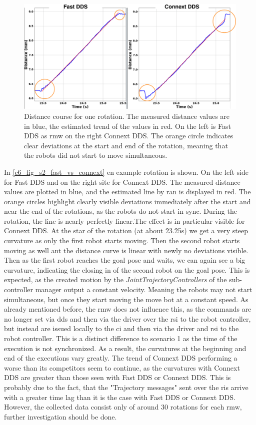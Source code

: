 \begin{figure}[H]
	\centering
	\includegraphics[width=1\textwidth]{Figures/c6/s2/s2_fast_vs_connext.png}
	\caption{Distance course for one rotation. The measured distance values are in blue, the estimated trend of the values in red. On the left is Fast DDS as \gls{rmw} on the right Connext DDS. The orange circle indicates clear deviations at the start and end of the rotation, meaning that the robots did not start to move simultaneous.}
	\label{c6_fig_s2_fast_vs_connext}
\end{figure}
In \autoref{c6_fig_s2_fast_vs_connext} en example rotation is shown. On the left side for Fast DDS and on the right site for Connext DDS. The measured distance values are plotted in blue, and the estimated line by \gls{ran} is displayed in red. The orange circles highlight clearly visible deviations immediately after the start and near the end of the rotations, as the robots do not start in sync. During the rotation, the line is nearly perfectly linear.The effect is in particular visible for Connext DDS. At the star of the rotation (at about 23.25s) we get a very steep curvature as only the first robot starts moving. Then the second robot starts moving as well ant the distance curve is linear with newly no deviations visible. Then as the first robot reaches the goal pose and waits, we can again see a big curvature, indicating the closing in of the second robot on the goal pose.\newline
This is expected, as the created motion by the \textit{JointTrajectoryControllers} of the sub-controller manager output a constant velocity. Meaning the robots may not start simultaneous, but once they start moving the move bot at a constant speed. As already mentioned before, the \gls{rmw} does not influence this, as the commands are no longer set via \gls{dds} and then via the driver over the \gls{rsi} to the robot controller, but instead are issued locally to the \gls{ci} and then via the driver and \gls{rsi} to the robot controller. This is a distinct difference to scenario 1 as the time of the execution is not synchronized. As a result, the curvatures at the beginning and end of the executions vary greatly. The trend of Connext DDS performing a worse than its competitors seem to continue, as the curvatures with Connext DDS  are greater than those seen with Fast DDS or Connext DDS. This is probably due to the fact, that the "Trajectory messages" sent over the \glspl{ri} arrive with a greater time lag than it is the case with Fast DDS or Connext DDS. However, the collected data consist only of around 30 rotations for each \gls{rmw}, further investigation should be done.

